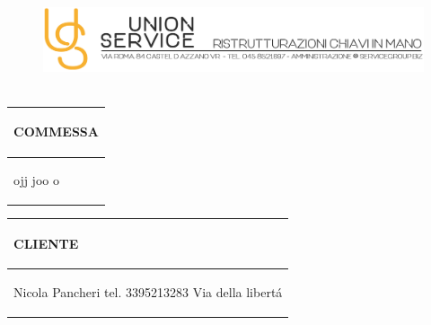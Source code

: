 \documentclass[a4paper]{article}
\begin{document}
                                \begin{figure}[!t]
                                \includegraphics[width=15.8cm, height=3cm]{intestazioneAlta2.jpg}
                                \end{figure}

                                \noindent\begin{tabular}{| L{72.2mm} |}
                                    \hline
                                    \vspace{2.5mm}
                                    \begin{spacing}{0}
                                    \textbf{COMMESSA}
                                    \end{spacing}\\
                                    \hline
                                    \vspace{4mm}
                                    \begin{spacing}{1.2}

                                ojj \newline joo \newline o
                                  \end{spacing}\\
                                    \hline
                                  \end{tabular}
                                  \quad
                                  \begin{tabular}{ | R{72.2mm} | }
                                    \hline
                                    \vspace{2.5mm}
                                    \begin{spacing}{0}
                                    \textbf{CLIENTE}
                                    \end{spacing}\\
                                    \hline
                                    \vspace{4mm}
                                    \begin{spacing}{1.2}

                               Nicola Pancheri \newline tel. 3395213283 \newline Via della libert\'a
                                  \end{spacing}\\
                                    \hline
                                  \end{tabular}
\end{document}
